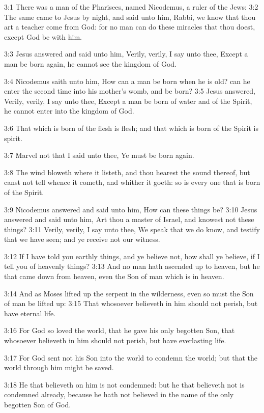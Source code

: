 3:1 There was a man of the Pharisees, named Nicodemus, a ruler of the
Jews: 3:2 The same came to Jesus by night, and said unto him, Rabbi,
we know that thou art a teacher come from God: for no man can do these
miracles that thou doest, except God be with him.

3:3 Jesus answered and said unto him, Verily, verily, I say unto thee,
Except a man be born again, he cannot see the kingdom of God.

3:4 Nicodemus saith unto him, How can a man be born when he is old?
can he enter the second time into his mother's womb, and be born?  3:5
Jesus answered, Verily, verily, I say unto thee, Except a man be born
of water and of the Spirit, he cannot enter into the kingdom of God.

3:6 That which is born of the flesh is flesh; and that which is born
of the Spirit is spirit.

3:7 Marvel not that I said unto thee, Ye must be born again.

3:8 The wind bloweth where it listeth, and thou hearest the sound
thereof, but canst not tell whence it cometh, and whither it goeth: so
is every one that is born of the Spirit.

3:9 Nicodemus answered and said unto him, How can these things be?
3:10 Jesus answered and said unto him, Art thou a master of Israel,
and knowest not these things?  3:11 Verily, verily, I say unto thee,
We speak that we do know, and testify that we have seen; and ye
receive not our witness.

3:12 If I have told you earthly things, and ye believe not, how shall
ye believe, if I tell you of heavenly things?  3:13 And no man hath
ascended up to heaven, but he that came down from heaven, even the Son
of man which is in heaven.

3:14 And as Moses lifted up the serpent in the wilderness, even so
must the Son of man be lifted up: 3:15 That whosoever believeth in him
should not perish, but have eternal life.

3:16 For God so loved the world, that he gave his only begotten Son,
that whosoever believeth in him should not perish, but have
everlasting life.

3:17 For God sent not his Son into the world to condemn the world; but
that the world through him might be saved.

3:18 He that believeth on him is not condemned: but he that believeth
not is condemned already, because he hath not believed in the name of
the only begotten Son of God.


